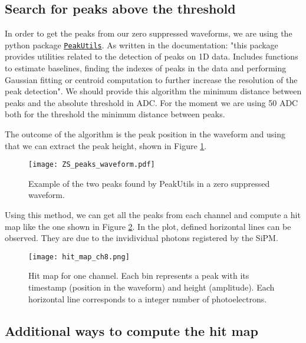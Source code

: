 \documentclass[11pt,a4paper,english,oneside, pdf]{article}
\begin{document}
	\subsection*{Search for peaks above the threshold}
	
	In order to get the peaks from our zero suppressed waveforms, we are using the python package \href{https://pypi.org/project/PeakUtils/}{\texttt{PeakUtils}}. As written in the documentation: "this package provides utilities related to the detection of peaks on 1D data. Includes functions to estimate baselines, finding the indexes of peaks in the data and performing Gaussian fitting or centroid computation to further increase the resolution of the peak detection". We should provide this algorithm the minimum distance between peaks and the absolute threshold in ADC. For the moment we are using 50 ADC both for the threshold the minimum distance between peaks.
	
	The outcome of the algorithm is the peak position in the waveform and using that we can extract the peak height, shown in Figure \ref{fig:ZS_peaks_waveform}.
	
	\begin{figure}[!h]
		\begin{center}
			\texttt{[image: ZS\_peaks\_waveform.pdf]}
			\caption{Example of the two peaks found by PeakUtils in a zero suppressed waveform.}
			\label{fig:ZS_peaks_waveform}
		\end{center}
	\end{figure}
	
	Using this method, we can get all the peaks from each channel and compute a hit map like the one shown in Figure \ref{fig:hit_map_example}. In the plot, defined horizontal lines can be observed. They are due to the invidividual photons registered by the SiPM.
	
	\begin{figure}[!h]
		\begin{center}
			\texttt{[image: hit\_map\_ch8.png]}
			\caption{Hit map for one channel. Each bin represents a peak with its timestamp (position in the waveform) and height (amplitude). Each horizontal line corresponds to a integer number of photoelectrons.}
			\label{fig:hit_map_example}
		\end{center}
	\end{figure}
	
	
	\subsection*{Additional ways to compute the hit map}
	
\end{document}
